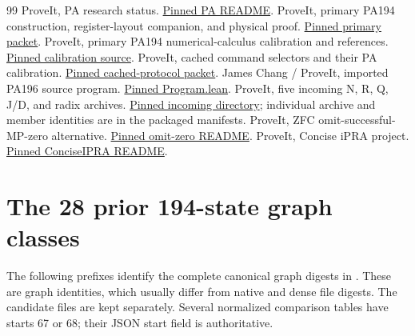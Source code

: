 \documentclass[11pt]{article}
\begin{document}
\begin{thebibliography}{99}
 ProveIt, PA research status.
\href{https://github.com/VladimirReshetnikov/ProveIt/blob/1e407ae841e4666f932777fad977ba784ebbcfd5/Computability/BusyBeaver/Research/PA/README.md}{Pinned PA README}.
 ProveIt, primary PA194 construction, register-layout companion, and physical proof.
\href{https://github.com/VladimirReshetnikov/ProveIt/tree/1e407ae841e4666f932777fad977ba784ebbcfd5/Computability/BusyBeaver/Research/PA/docs/pa194_conpa_2026-11-13}{Pinned primary packet}.
 ProveIt, primary PA194 numerical-calculus calibration and references.
\href{https://github.com/VladimirReshetnikov/ProveIt/blob/1e407ae841e4666f932777fad977ba784ebbcfd5/Computability/BusyBeaver/Research/PA/docs/pa194_conpa_2026-11-13/report/calibration.tex}{Pinned calibration source}.
 ProveIt, cached command selectors and their PA calibration.
\href{https://github.com/VladimirReshetnikov/ProveIt/tree/1e407ae841e4666f932777fad977ba784ebbcfd5/Computability/BusyBeaver/Research/PA/docs/pa194c_conpa}{Pinned cached-protocol packet}.
 James Chang / ProveIt, imported PA196 source program.
\href{https://github.com/VladimirReshetnikov/ProveIt/blob/1e407ae841e4666f932777fad977ba784ebbcfd5/Computability/BusyBeaver/Research/PA/jamesyc-upstream/pa196/PA196/Program.lean}{Pinned Program.lean}.
 ProveIt, five incoming N, R, Q, J/D, and radix archives.
\href{https://github.com/VladimirReshetnikov/ProveIt/tree/1e407ae841e4666f932777fad977ba784ebbcfd5/docs/incoming}{Pinned incoming directory}; individual archive and member identities are in the packaged manifests.
 ProveIt, ZFC omit-successful-MP-zero alternative.
\href{https://github.com/VladimirReshetnikov/ProveIt/blob/1e407ae841e4666f932777fad977ba784ebbcfd5/Computability/BusyBeaver/Research/ZFC/candidate-k218/alternatives/omit-zero/README.md}{Pinned omit-zero README}.
 ProveIt, Concise iPRA project.
\href{https://github.com/VladimirReshetnikov/ProveIt/blob/1e407ae841e4666f932777fad977ba784ebbcfd5/Logic/PrimitiveRecursiveArithmetic/ConciseIPRA/README.md}{Pinned ConciseIPRA README}.
\end{thebibliography}

\appendix
\section{The 28 prior 194-state graph classes}\label{app:graphs}
The following prefixes identify the complete canonical graph digests in
. These are graph identities, which
usually differ from native and dense file digests. The candidate files are
kept separately. Several normalized comparison tables have starts 67 or
68; their JSON start field is authoritative.

\end{document}
